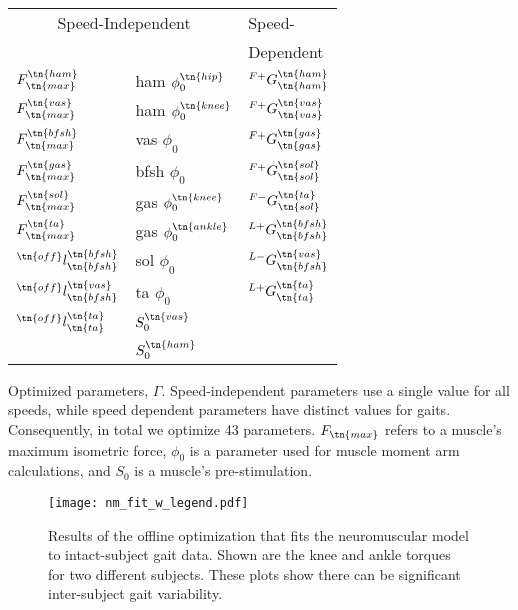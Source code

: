\begin{margintable}[-3in]    
    \centering
    \small
    \begin{tabular}{ll|l}
        \multicolumn{2}{c|}{Speed-Independent} & Speed- \\
                                         &     & Dependent \\
        \midrule
        $F_\tn{max}^\tn{ham}$            & ham $\phi_0^\tn{hip}$   & $^{F+}G_\tn{ham}^\tn{ham}$   \\
        $F_\tn{max}^\tn{vas}$            & ham $\phi_0^\tn{knee}$  & $^{F+}G_\tn{vas}^\tn{vas}$   \\
        $F_\tn{max}^\tn{bfsh}$           & vas $\phi_0$            & $^{F+}G_\tn{gas}^\tn{gas}$   \\
        $F_\tn{max}^\tn{gas}$            & bfsh $\phi_0$           & $^{F+}G_\tn{sol}^\tn{sol}$   \\
        $F_\tn{max}^\tn{sol}$            & gas $\phi_0^\tn{knee}$  & $^{F-}G_\tn{sol}^\tn{ta}$    \\
        $F_\tn{max}^\tn{ta}$             & gas $\phi_0^\tn{ankle}$ & $^{L+}G_\tn{bfsh}^\tn{bfsh}$ \\
        $^\tn{off}l_\tn{bfsh}^\tn{bfsh}$ & sol $\phi_0$            & $^{L-}G_\tn{bfsh}^\tn{vas}$  \\
        $^\tn{off}l_\tn{bfsh}^\tn{vas}$  & ta  $\phi_0$            & $^{L+}G_\tn{ta}^\tn{ta}$     \\
        $^\tn{off}l_\tn{ta}^\tn{ta}$     & $S_0^\tn{vas}$          & \\
                                         & $S_0^\tn{ham}$          & \\
    \end{tabular}
    \caption[Parameters optimized to generate parameter sets for dueling bandits
    optimization]{Optimized parameters, $\Gamma$. Speed-independent parameters
    use a single value for all speeds, while speed dependent parameters have
    distinct values for  gaits. Consequently,
    in total we optimize 43 parameters. $F_\tn{max}$ refers to a muscle's maximum
    isometric force, $\phi_0$ is a parameter used for muscle moment arm
    calculations, and $S_0$ is a muscle's pre-stimulation.}\label{tab:params}
\end{margintable}

\begin{figure}
    \centering 
    \texttt{[image: nm\_fit\_w\_legend.pdf]}
    \caption{Results of the offline optimization that fits the neuromuscular
    model to intact-subject gait data. Shown are the knee and ankle torques for
    two different subjects. These plots show there can be significant
    inter-subject gait variability.}\label{fig:nm_fit}
\end{figure}

